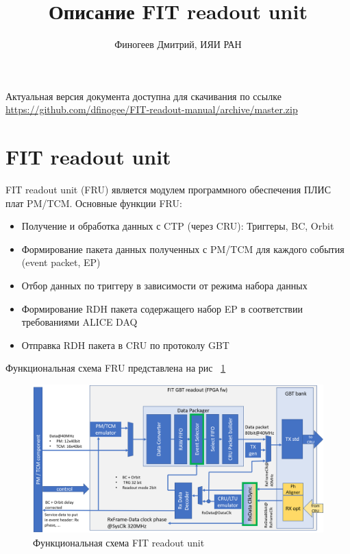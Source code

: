 \documentclass{article}
\title{Описание FIT readout unit}
\author{Финогеев Дмитрий, ИЯИ РАН}
\begin{document}
\maketitle

Актуальная версия документа доступна для скачивания по ссылке
\newline
\url{https://github.com/dfinogee/FIT-readout-manual/archive/master.zip}



\tableofcontents

\newpage

\section{FIT readout unit}
FIT readout unit (FRU) является модулем программного обеспечения ПЛИС плат PM/TCM. Основные функции FRU:

\begin{itemize}
\item Получение и обработка данных с CTP (через CRU): Триггеры, BC, Orbit 
\item Формирование пакета данных полученных с PM/TCM для каждого события (event packet, EP)
\item Отбор данных по триггеру в зависимости от режима набора данных
\item Формирование RDH пакета содержащего набор EP в соответствии требованиями ALICE DAQ 
\item Отправка RDH пакета в CRU по протоколу GBT
\end{itemize}


Функциональная схема FRU представлена на рис ~\ref{fig:2}
\begin{figure}[H]
	\centering 
	\includegraphics[width=1\textwidth]{FIT_readout.png}
	\caption{\label{fig:2} Функциональная схема FIT readout unit}
\end{figure}
\end{document}
